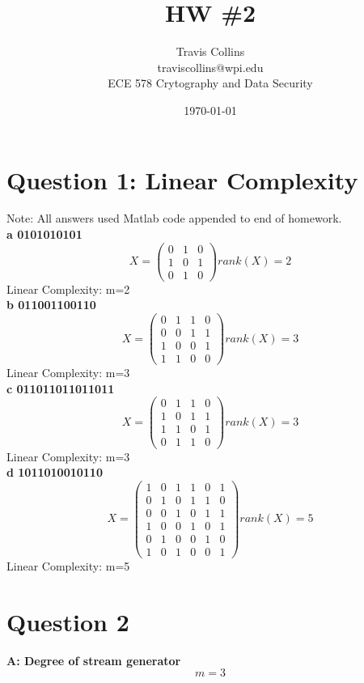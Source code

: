 \documentclass[12pt]{article}
\title{HW \#2}
\author{
        Travis Collins \\
	traviscollins@wpi.edu \\
	ECE 578 Crytography and Data Security
}
\date{\today}
\begin{document}
\maketitle

\section{Question 1: Linear Complexity}
Note: All answers used Matlab code appended to end of homework.\\
\textbf{a 0101010101}
\[ X = \left( \begin{array}{ccc}
0 & 1 & 0 \\
1 & 0 & 1 \\
0 & 1 & 0 \end{array} \right)  rank(X) = 2\] 
Linear Complexity: m=2\\

\textbf{b 011001100110}
\[ X = \left( \begin{array}{cccc}
0 & 1 & 1 & 0 \\
0 & 0 & 1 & 1 \\
1 & 0 & 0 & 1 \\
1 & 1 & 0 & 0 \end{array} \right)  rank(X) = 3\] 
Linear Complexity: m=3\\

\textbf{c 011011011011011}
\[ X = \left( \begin{array}{cccc}
0 & 1 & 1 & 0  \\
1 & 0 & 1 & 1  \\
1 & 1 & 0 & 1  \\
0 & 1 & 1 & 0\end{array} \right)  rank(X) = 3\] 
Linear Complexity: m=3\\

\textbf{d 1011010010110}
\[ X = \left( \begin{array}{cccccc}
1 & 0 & 1 & 1 & 0 & 1\\
0 & 1 & 0 & 1 & 1 & 0\\
0 & 0 & 1 & 0 & 1 & 1\\
1 & 0 & 0 & 1 & 0 & 1\\
0 & 1 & 0 & 0 & 1 & 0\\
1 & 0 & 1 & 0 & 0 & 1\end{array} \right)  rank(X) = 5\] 
Linear Complexity: m=5\\


\section{Question 2}
\textbf{A: Degree of stream generator}
\[m=3\]\\
\end{document}
